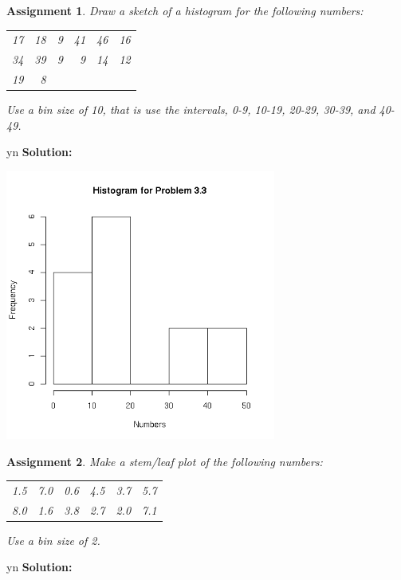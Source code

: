 \documentclass[12pt]{article}
\def\solutions{y}
\def\solutions{n}
\newtheorem{assignment}{Assignment}[section]
\begin{document}
\fi

\begin{assignment}
  Draw a sketch of a histogram for the following numbers:
  \begin{center}
    \begin{tabular}{rrrrrr}
      17 & 18 & 9 & 41 & 46 & 16 \\
      34 & 39 & 9 & 9  & 14 & 12 \\
      19 & 8      
    \end{tabular}
  \end{center}
  Use a bin size of 10, that is use the intervals, 0-9, 10-19, 20-29,
  30-39, and 40-49.
\end{assignment}

\if y\solutions
\textbf{Solution:} 

\centerline{\includegraphics[width=3.5in]{prob33}}
\fi

\begin{assignment}
  Make a stem/leaf plot of the following numbers:
  \begin{center}
    \begin{tabular}{rrrrrr}
       1.5 & 7.0 & 0.6 & 4.5 & 3.7 & 5.7 \\
       8.0 & 1.6 & 3.8 & 2.7 & 2.0 & 7.1
    \end{tabular}
  \end{center}
  Use a bin size of 2.
\end{assignment}

\if y\solutions
\textbf{Solution:} 
\end{document}
